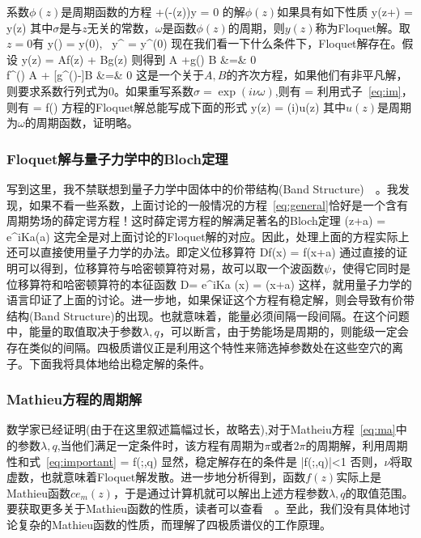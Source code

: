 \documentclass{ctexart}
\begin{document}
\par 系数$\phi(z)$是周期函数的方程 
\beq 
{}+(\lambda-\phi(z))y = 0
\eeq
的解$\phi(z)$如果具有如下性质
\beq
y(z+\omega) = \sigma y(z)
\eeq
其中$\sigma$是与$z$无关的常数，$\omega$是函数$\phi(z)$的周期，则$y(z)$称为Floquet解。取$z=0$有
\beq
y(\omega) = \sigma y(0), \, y^{\prime} = \sigma y^{\prime}(0)
\eeq
现在我们看一下什么条件下，Floquet解存在。假设
\beq
y(z) = Af(z) + Bg(z)
\eeq
则得到
A +g(\omega) B &=& 0\\
    f^{\prime}(\omega) A + [g^{\prime}(\omega)-\sigma]B &=& 0
\eea
这是一个关于$A,B$的齐次方程，如果他们有非平凡解，则要求系数行列式为0。如果重写系数$\sigma = \exp(i\nu \omega)$,则有
\beq
\cos \nu \omega = 
\eeq
利用式子~\ref{eq:im}，则有
\beq\label{eq:important}
\cos\nu\omega = f(\omega)
\eeq
方程的Floquet解总能写成下面的形式
\beq
y(z) = \exp(i\nu \omega)u(z)
\eeq
其中$u(z)$是周期为$\omega$的周期函数，证明略。
\subsubsection{Floquet解与量子力学中的Bloch定理}
\par 写到这里，我不禁联想到量子力学中固体中的价带结构(Band Structure)~\cite{band_structure}~\cite{aqm}。我发现，如果不看一些系数，上面讨论的一般情况的方程~\ref{eq:general}恰好是一个含有周期势场的薛定谔方程！这时薛定谔方程的解满足著名的Bloch定理
\beq
\psi(z+a) = e^{iKa}\psi(a)
\eeq
这完全是对上面讨论的Floquet解的对应。因此，处理上面的方程实际上还可以直接使用量子力学的办法。即定义位移算符
\beq
Df(x) = f(x+a)
\eeq
通过直接的证明可以得到，位移算符与哈密顿算符对易，故可以取一个波函数$\psi$，使得它同时是位移算符和哈密顿算符的本征函数
\beq
D\psi = e^{iKa} \psi(x) = \psi(x+a)
\eeq
这样，就用量子力学的语言印证了上面的讨论。进一步地，如果保证这个方程有稳定解，则会导致有价带结构(Band Structure)的出现。也就意味着，能量必须间隔一段间隔。在这个问题中，能量的取值取决于参数$\lambda,q$，可以断言，由于势能场是周期的，则能级一定会存在类似的间隔。四极质谱仪正是利用这个特性来筛选掉参数处在这些空穴的离子。下面我将具体地给出稳定解的条件。

\subsubsection{Mathieu方程的周期解}
\par 数学家已经证明(由于在这里叙述篇幅过长，故略去),对于Matheiu方程~\ref{eq:ma}中的参数$\lambda,q$,当他们满足一定条件时，该方程有周期为$\pi$或者$2\pi$的周期解，利用周期性和式~\ref{eq:important}
\beq
\cos\nu \pi = f(\pi;\lambda,q)
\eeq
显然，稳定解存在的条件是
\beq\label{eq:condition}
|f(\pi;\lambda,q)|<1
\eeq
否则，$\nu$将取虚数，也就意味着Floquet解发散。进一步地分析得到，函数$f(z)$实际上是Mathieu函数$ce_m(z)$，于是通过计算机就可以解出上述方程参数$\lambda,q$的取值范围。要获取更多关于Mathieu函数的性质，读者可以查看~\cite{ma_func}~\cite{special_func}。至此，我们没有具体地讨论复杂的Mathieu函数的性质，而理解了四极质谱仪的工作原理。
\end{document}
